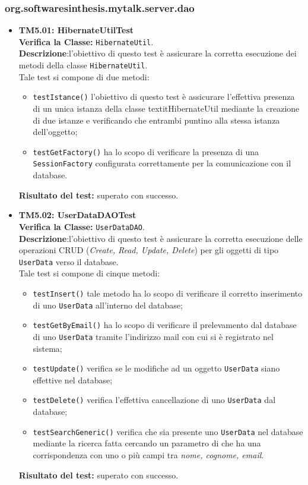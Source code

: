\subsubsection{org.softwaresinthesis.mytalk.server.dao}
\begin{itemize}
\item \textbf{TM5.01: HibernateUtilTest}\\
\textbf{Verifica la Classe:} \texttt{HibernateUtil}.\\
\textbf{Descrizione}:l'obiettivo di questo test è assicurare la corretta esecuzione dei metodi della classe \texttt{HibernateUtil}. \\
Tale test si compone di due metodi:
\begin{itemize}
\item \texttt{testIstance()} l'obiettivo di questo test è assicurare l'effettiva presenza di un unica istanza della classe textit{HibernateUtil} mediante la creazione di due istanze e verificando che entrambi puntino alla stessa istanza dell'oggetto;
\item \texttt{testGetFactory()} ha lo scopo di verificare la presenza di una \texttt{SessionFactory} configurata correttamente per la comunicazione con il database.
\end{itemize}
\textbf{Risultato del test:} superato con successo.

\item \textbf{TM5.02: UserDataDAOTest}\\
\textbf{Verifica la Classe:} \texttt{UserDataDAO}.\\
\textbf{Descrizione}:l'obiettivo di questo test è assicurare la corretta esecuzione delle operazioni CRUD (\textit{Create, Read, Update, Delete}) per gli oggetti di tipo \texttt{UserData} verso il database. \\
Tale test si compone di cinque metodi:
\begin{itemize}
\item \texttt{testInsert()} tale metodo ha lo scopo di verificare il corretto inserimento di uno \texttt{UserData} all'interno del database;
\item \texttt{testGetByEmail()} ha lo scopo di verificare il prelevamento dal database di uno \texttt{UserData} tramite l'indirizzo mail con cui si è registrato nel sistema;
\item \texttt{testUpdate()} verifica se le modifiche ad un oggetto \texttt{UserData} siano effettive nel database;
\item \texttt{testDelete()} verifica l'effettiva cancellazione di uno \texttt{UserData} dal database;
\item \texttt{testSearchGeneric()} verifica che sia presente uno \texttt{UserData} nel database mediante la ricerca fatta cercando un parametro di  che ha una corrispondenza con uno o più campi tra \textit{nome, cognome, email}.
\end{itemize}
\textbf{Risultato del test:} superato con successo.



\end{itemize}

